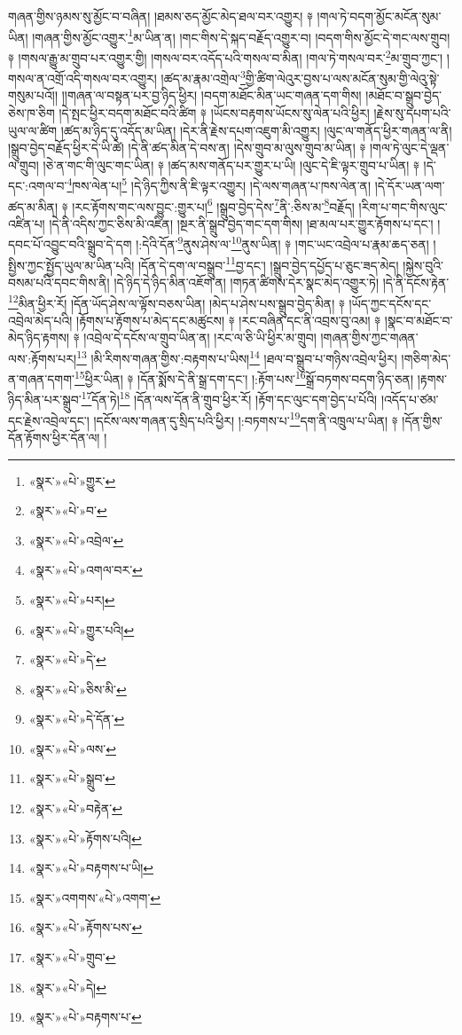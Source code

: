 གཞན་གྱིས་ཉམས་སུ་མྱོང་བ་བཞིན། །ཐམས་ཅད་མྱོང་མེད་ཐལ་བར་འགྱུར། ༈ །གལ་ཏེ་བདག་མྱོང་མངོན་སུམ་ཡིན། །གཞན་གྱིས་མྱོང་འགྱུར་\footnote{«སྣར་»«པེ་»གྱུར་}མ་ཡིན་ན། །གང་གིས་དེ་སྐད་བརྗོད་འགྱུར་བ། །བདག་གིས་མྱོང་དེ་གང་ལས་གྲུབ། ༈ །གསལ་རྒྱུ་མ་གྲུབ་པར་འགྱུར་གྱི། །གསལ་བར་འདོད་པའི་གསལ་བ་མིན། །གལ་ཏེ་གསལ་བར་\footnote{«སྣར་»«པེ་»བ་}མ་གྲུབ་ཀྱང་། །གསལ་ན་འགྲོ་འདི་གསལ་བར་འགྱུར། །ཚད་མ་རྣམ་འགྲེལ་\footnote{«སྣར་»«པེ་»འབྲེལ་}གྱི་ཚིག་ལེའུར་བྱས་པ་ལས་མངོན་སུམ་གྱི་ལེའུ་སྟེ་གསུམ་པའོ།། །།གཞན་ལ་བསྟན་པར་བྱ་ཉིད་ཕྱིར། །བདག་མཐོང་མིན་ཡང་གཞན་དག་གིས། །མཐོང་བ་སྒྲུབ་བྱེད་ཅེས་ཁ་ཅིག །དེ་སྤང་ཕྱིར་བདག་མཐོང་བའི་ཚིག ༈ །ཡོངས་བརྟགས་ཡོངས་སུ་ལེན་པའི་ཕྱིར། །རྗེས་སུ་དཔག་པའི་ཡུལ་ལ་ཚིག །ཚད་མ་ཉིད་དུ་འདོད་མ་ཡིན། །དེར་ནི་རྗེས་དཔག་འཇུག་མི་འགྱུར། །ལུང་ལ་གནོད་ཕྱིར་གཞན་ལ་ནི། །སྒྲུབ་བྱེད་བརྗོད་ཕྱིར་དེ་ཡི་ཚེ། །དེ་ནི་ཚད་མིན་དེ་བས་ན། །དེས་གྲུབ་མ་ལུས་གྲུབ་མ་ཡིན། ༈ །གལ་ཏེ་ལུང་དེ་ལྡན་ལ་གྲུབ། །ཅེ་ན་གང་གི་ལུང་གང་ཡིན། ༈ །ཚད་མས་གནོད་པར་གྱུར་པ་ཡི། །ལུང་དེ་ཇི་ལྟར་གྲུབ་པ་ཡིན། ༈ །དེ་དང་:འགལ་བ་\footnote{«སྣར་»«པེ་»འགལ་བར་}ཁས་ལེན་པ།\footnote{«སྣར་»«པེ་»པར།} །དེ་ཉིད་ཀྱིས་ནི་ཇི་ལྟར་འགྱུར། །དེ་ལས་གཞན་པ་ཁས་ལེན་ན། །དེ་དོར་ཡན་ལག་ཚད་མ་མིན། ༈ །རང་རྟོགས་གང་ལས་བྱུང་:གྱུར་པ།\footnote{«སྣར་»«པེ་»གྱུར་པའི།} །སྒྲུབ་བྱེད་དེས་\footnote{«སྣར་»«པེ་»དེ་}ནི་:ཅིས་མ་\footnote{«སྣར་»«པེ་»ཅིས་མི་}བརྗོད། །རིག་པ་གང་གིས་ལུང་འཛིན་པ། །དེ་ནི་འདིས་ཀྱང་ཅིས་མི་འཛིན། །སྔར་ནི་སྒྲུབ་བྱེད་གང་དག་གིས། །ཐ་མལ་པར་གྱུར་རྟོགས་པ་དང་། །དབང་པོ་འབྱུང་བའི་སྒྲུབ་དེ་དག །:དེའི་དོན་\footnote{«སྣར་»«པེ་»དེ་དོན་}ནུས་ཤེས་ལ་\footnote{«སྣར་»«པེ་»ལས་}ནུས་ཡིན། ༈ །གང་ཡང་འབྲེལ་པ་རྣམ་ཆད་ཅན། །སྤྱིས་ཀྱང་སྤྱོད་ཡུལ་མ་ཡིན་པའི། །དོན་དེ་དག་ལ་བསྒྲུབ་\footnote{«སྣར་»«པེ་»སྒྲུབ་}བྱ་དང་། །སྒྲུབ་བྱེད་དཔྱོད་པ་ཅུང་ཟད་མེད། །སྐྱེས་བུའི་བསམ་པའི་དབང་གིས་ནི། །དེ་ཉིད་དེ་ཉིད་མིན་འཇོག་ན། །གཏན་ཚིགས་དེར་སྣང་མེད་འགྱུར་ཏེ། །དེ་ནི་དངོས་རྟེན་\footnote{«སྣར་»«པེ་»བརྟེན་}མིན་ཕྱིར་རོ། །དོན་ཡོད་ཤེས་ལ་ལྟོས་བཅས་ཡིན། །མེད་པ་ཤེས་པས་སྒྲུབ་བྱེད་མིན། ༈ །ཡོད་ཀྱང་དངོས་དང་འབྲེལ་མེད་པའི། །རྟོགས་པ་རྟོགས་པ་མེད་དང་མཚུངས། ༈ །རང་བཞིན་དང་ནི་འབྲས་བུ་འམ། ༈ །སྣང་བ་མཐོང་བ་མེད་ཉིད་རྟགས། ༈ །འབྲེལ་དེ་དངོས་ལ་གྲུབ་ཡིན་ན། །རང་ལ་ཅི་ཡི་ཕྱིར་མ་གྲུབ། །གཞན་གྱིས་ཀྱང་གཞན་ལས་:རྟོགས་པར།\footnote{«སྣར་»«པེ་»རྟོགས་པའི།} །མི་རིགས་གཞན་གྱིས་:བརྟགས་པ་ཡིས།\footnote{«སྣར་»«པེ་»བརྟགས་པ་ཡི།} །ཐལ་བ་སྒྲུབ་པ་གཉིས་འབྲེལ་ཕྱིར། །གཅིག་མེད་ན་གཞན་དགག་\footnote{«སྣར་»འགགས་«པེ་»འགག་}ཕྱིར་ཡིན། ༈ །དོན་སྨོས་དེ་ནི་སྒྲ་དག་དང་། །:རྟོག་པས་\footnote{«སྣར་»«པེ་»རྟོགས་པས་}སྒྲོ་བཏགས་བདག་ཉིད་ཅན། །རྟགས་ཉིད་མིན་པར་སྒྲུབ་\footnote{«སྣར་»«པེ་»གྲུབ་}དོན་ཏེ།\footnote{«སྣར་»«པེ་»དེ།} །དོན་ལས་དོན་ནི་གྲུབ་ཕྱིར་རོ། །རྟོག་དང་ལུང་དག་བྱེད་པ་པོའི། །འདོད་པ་ཙམ་དང་རྗེས་འབྲེལ་དང་། །དངོས་ལས་གཞན་དུ་སྲིད་པའི་ཕྱིར། །:བཏགས་པ་\footnote{«སྣར་»«པེ་»བརྟགས་པ་}དག་ནི་འཁྲུལ་པ་ཡིན། ༈ །དོན་གྱིས་དོན་རྟོགས་ཕྱིར་དོན་ལ། །
